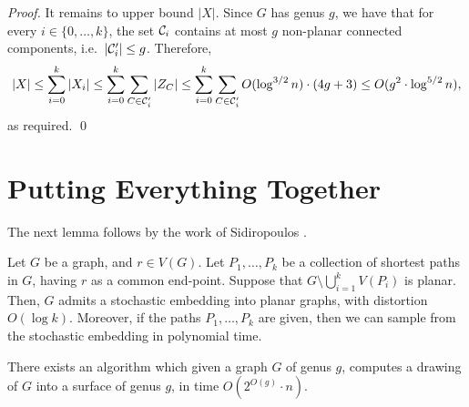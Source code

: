 \documentclass[envcountsect]{llncs}
\begin{document}
\begin{proof}
It remains to upper bound $|X|$.
Since $G$ has genus $g$, we have that for every $i\in \{0,\ldots,k\}$, the set ${\cal C}_i$ contains at most $g$ non-planar connected components, i.e.~$|{\cal C}_i'|\leq g$.
Therefore,
\[
|X| \leq \sum_{i=0}^k |X_i| \leq \sum_{i=0}^k \sum_{C\in {\cal C}_i'} |Z_C| \leq \sum_{i=0}^k \sum_{C\in {\cal C}_i'} O(\log^{3/2} n)\cdot (4g+3) \leq O(g^2 \cdot \log^{5/2} n),
\]
as required.
\qed
\end{proof}

\section{Putting Everything Together}

The next lemma follows by the work of Sidiropoulos \cite{sidiropoulos2010optimal}.

\begin{lemma}\label{lem:optimal}
Let $G$ be a graph, and $r\in V(G)$.
Let $P_1,\ldots,P_k$ be a collection of shortest paths in $G$, having $r$ as a common end-point.
Suppose that $G \setminus \bigcup_{i=1}^k V(P_i)$ is planar.
Then, $G$ admits a stochastic embedding into planar graphs, with distortion $O(\log k)$.
Moreover, if the paths $P_1,\ldots, P_k$ are given, then we can sample from the stochastic embedding in polynomial time.
\end{lemma}

\begin{theorem}\label{thm:genus_linear}
There exists an algorithm which given a graph $G$ of genus $g$, computes a drawing of $G$ into a surface of genus $g$, in time $O\left(2^{O(g)}\cdot n\right)$.
\end{theorem}
\end{document}
